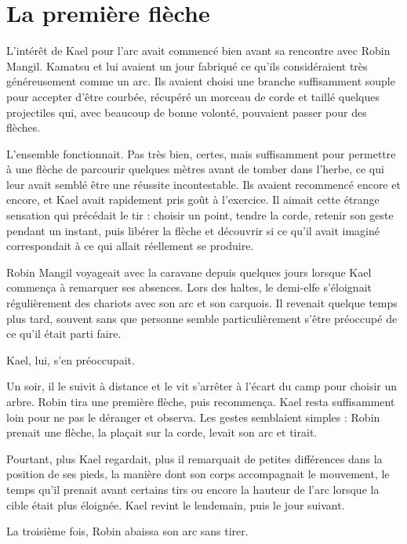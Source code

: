 \chapter{La première flèche}
\label{chap:premiere-fleche}

L'intérêt de Kael pour l'arc avait commencé bien avant sa rencontre avec Robin
Mangil. Kamatsu et lui avaient un jour fabriqué ce qu'ils considéraient très
généreusement comme un arc. Ils avaient choisi une branche suffisamment souple
pour accepter d'être courbée, récupéré un morceau de corde et taillé quelques
projectiles qui, avec beaucoup de bonne volonté, pouvaient passer pour des
flèches.

L'ensemble fonctionnait. Pas très bien, certes, mais suffisamment pour
permettre à une flèche de parcourir quelques mètres avant de tomber dans
l'herbe, ce qui leur avait semblé être une réussite incontestable. Ils avaient
recommencé encore et encore, et Kael avait rapidement pris goût à l'exercice.
Il aimait cette étrange sensation qui précédait le tir : choisir un point,
tendre la corde, retenir son geste pendant un instant, puis libérer la flèche
et découvrir si ce qu'il avait imaginé correspondait à ce qui allait réellement
se produire.

\scenebreak

Robin Mangil voyageait avec la caravane depuis quelques jours lorsque Kael
commença à remarquer ses absences. Lors des haltes, le demi-elfe s'éloignait
régulièrement des chariots avec son arc et son carquois. Il revenait quelque
temps plus tard, souvent sans que personne semble particulièrement s'être
préoccupé de ce qu'il était parti faire.

Kael, lui, s'en préoccupait.

Un soir, il le suivit à distance et le vit s'arrêter à l'écart du camp pour
choisir un arbre. Robin tira une première flèche, puis recommença. Kael resta
suffisamment loin pour ne pas le déranger et observa. Les gestes semblaient
simples : Robin prenait une flèche, la plaçait sur la corde, levait son arc et
tirait.

Pourtant, plus Kael regardait, plus il remarquait de petites différences dans
la position de ses pieds, la manière dont son corps accompagnait le mouvement,
le temps qu'il prenait avant certains tirs ou encore la hauteur de l'arc
lorsque la cible était plus éloignée. Kael revint le lendemain, puis le jour
suivant.

La troisième fois, Robin abaissa son arc sans tirer.

